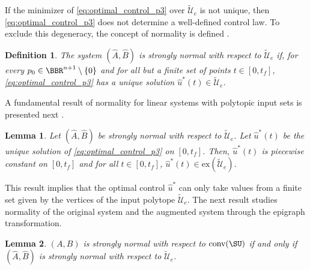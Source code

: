 \documentclass[conf]{new-aiaa}
\newtheorem{lemma}{Lemma}
\newtheorem{definition}{Definition}
\begin{document}
If the minimizer of \cref{eq:optimal_control_p3} over $\tilde{\mathcal{U}}_e$ is not unique, then \cref{eq:optimal_control_p3} does not determine a well-defined control law. To exclude this degeneracy, the concept of normality is defined \cite[Definition 6.7.11]{berkovitz_nonlinear_2013}.

\begin{definition}\rm \label{def:normality}
    The system $(\hat{A},\hat{B})$ is \emph{strongly normal} with respect to $\tilde{\mathcal{U}}_e$ if, for every $p_0 \in \BBR^{n+1} \setminus \{0\}$ and for all but a finite set of points $t \in [0,t_f]$, \eqref{eq:optimal_control_p3} has a unique solution $\hat{u}^*(t) \in \tilde{\mathcal{U}}_e$.
\end{definition}

A fundamental result of normality for linear systems with polytopic input sets is presented next \cite[Corollary 6.7.7]{berkovitz_nonlinear_2013}.

\begin{lemma}\label{lemma:vertices_normality}
    Let $(\hat{A},\hat{B})$ be strongly normal with respect to $\tilde{\mathcal{U}}_e$. Let $\hat{u}^*(t)$ be the unique solution of \eqref{eq:optimal_control_p3} on $[0,t_f]$. Then, $\hat{u}^*(t)$ is piecewise constant on $[0,t_f]$ and for all $t \in [0,t_f]$, $\hat{u}^*(t) \in \mathrm{ex}(\tilde{\mathcal{U}}_e)$.
\end{lemma}

This result implies that the optimal control $\hat{u}^*$ can only take values from a finite set given by the vertices of the input polytope $\tilde{\mathcal{U}}_e$. The next result studies normality of the original system and the augmented system through the epigraph transformation.

\begin{lemma}\rm{ \label{lemma:Normality_augmented}}
    $(A, B)$ is strongly normal with respect to $\mathrm{conv}(\SU)$ if and only if $(\hat{A}, \hat{B})$ is strongly normal with respect to $\tilde{\mathcal{U}}_e$.
\end{lemma}
\end{document}
